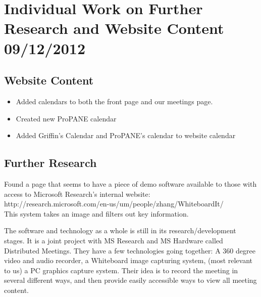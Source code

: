 \documentclass[]{article}
\begin{document}
	
	\section{Individual Work on Further Research and Website Content 09/12/2012}
		\subsection{Website Content}
			\begin{itemize}
				\item Added calendars to both the front page and our meetings page.
				\item Created new ProPANE calendar
				\item Added Griffin's Calendar and ProPANE's calendar to website calendar
			\end{itemize}
		\subsection{Further Research}
			Found a page that seems to have a piece of demo software available to those with access to Microsoft Research’s internal website:\\
			http://research.microsoft.com/en-us/um/people/zhang/WhiteboardIt/\\
			This system takes an image and filters out key information.
			
			The software and technology as a whole is still in its research/development stages. It is a joint project with MS Research and MS Hardware called Distributed Meetings. They have a few technologies going together: A 360 degree video and audio recorder, a Whiteboard image capturing system, (most relevant to us) a PC graphics capture system. Their idea is to record the meeting in several different ways, and then provide easily accessible ways to view all meeting content.
		
\end{document}
